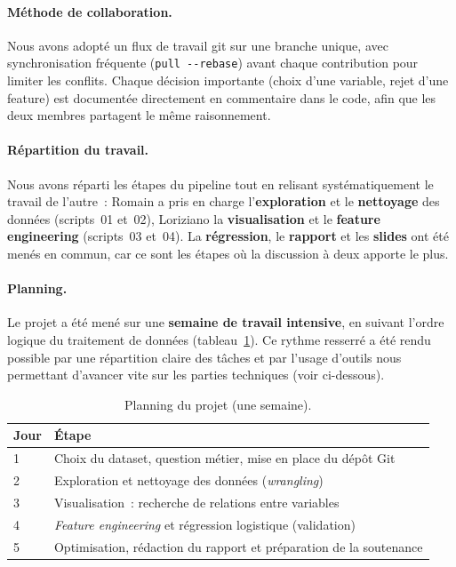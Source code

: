 \documentclass[11pt,a4paper]{article}
\begin{document}
\paragraph{Méthode de collaboration.} Nous avons adopté un flux de travail
git sur une branche unique, avec synchronisation fréquente
(\texttt{pull -{}-rebase}) avant chaque contribution pour limiter les
conflits. Chaque décision importante (choix d'une variable, rejet d'une
feature) est documentée directement en commentaire dans le code, afin que les
deux membres partagent le même raisonnement.

\paragraph{Répartition du travail.} Nous avons réparti les étapes du pipeline
tout en relisant systématiquement le travail de l'autre~: Romain a pris en
charge l'\textbf{exploration} et le \textbf{nettoyage} des données (scripts~01
et~02), Loriziano la \textbf{visualisation} et le \textbf{feature engineering}
(scripts~03 et~04). La \textbf{régression}, le \textbf{rapport} et les
\textbf{slides} ont été menés en commun, car ce sont les étapes où la
discussion à deux apporte le plus.

\paragraph{Planning.} Le projet a été mené sur une \textbf{semaine de travail
intensive}, en suivant l'ordre logique du traitement de données
(tableau~\ref{tab:planning}). Ce rythme resserré a été rendu possible par une
répartition claire des tâches et par l'usage d'outils nous permettant
d'avancer vite sur les parties techniques (voir ci-dessous).

\begin{table}[H]
\centering
\caption{Planning du projet (une semaine).}
\label{tab:planning}
\begin{tabular}{ll}
\toprule
Jour & Étape \\
\midrule
1 & Choix du dataset, question métier, mise en place du dépôt Git \\
2 & Exploration et nettoyage des données (\textit{wrangling}) \\
3 & Visualisation~: recherche de relations entre variables \\
4 & \textit{Feature engineering} et régression logistique (validation) \\
5 & Optimisation, rédaction du rapport et préparation de la soutenance \\
\bottomrule
\end{tabular}
\end{table}
\end{document}
